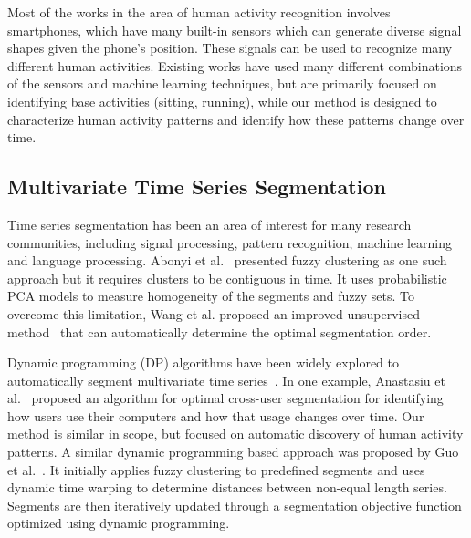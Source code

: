 Most of the works in the area of human activity recognition involves smartphones, which have many built-in sensors  which can generate diverse signal shapes given the phone's position. These signals can be used to recognize many different human activities. Existing works have used many different combinations of the sensors and machine learning techniques, but are primarily focused on identifying base activities (sitting, running), while our method is designed to characterize human activity patterns and identify how these patterns change over time.

\subsection{Multivariate Time Series Segmentation}
Time series segmentation has been an area of interest for many research communities, including signal processing, pattern recognition, machine learning and language processing. 
%
Abonyi et al.~\cite{abonyi2005} presented fuzzy clustering as one such approach but it requires clusters to be contiguous in time. It uses probabilistic PCA models to measure homogeneity of the segments and fuzzy sets. To overcome this limitation, Wang et al. proposed an improved unsupervised method~\cite{wang2012} that can automatically determine the optimal segmentation order. 

Dynamic programming (DP) algorithms have been widely explored to automatically segment multivariate time series~\cite{guo2015, anastasiu2015}. 
In one example, Anastasiu et al.~\cite{anastasiu2015} proposed an algorithm for optimal cross-user segmentation for identifying how users use their computers and how that usage changes over time. Our method is similar in scope, but focused on automatic discovery of human activity patterns. A similar dynamic programming based approach was proposed by Guo et al.~\cite{guo2016}. It initially applies fuzzy clustering to predefined segments and uses dynamic time warping to determine distances between non-equal length series. Segments are then iteratively updated through a segmentation objective function optimized using dynamic programming.

